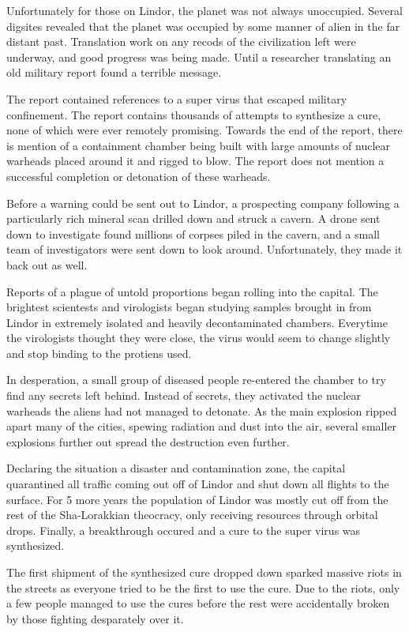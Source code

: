 Unfortunately for those on Lindor, the planet was not always unoccupied.
Several digsites revealed that the planet was occupied by some manner of alien
in the far distant past. Translation work on any recods of the civilization
left were underway, and good progress was being made. Until a researcher
translating an old military report found a terrible message.

The report contained references to a super virus that escaped military
confinement. The report contains thousands of attempts to synthesize a cure,
none of which were ever remotely promising. Towards the end of the report,
there is mention of a containment chamber being built with large amounts of
nuclear warheads placed around it and rigged to blow. The report does not
mention a successful completion or detonation of these warheads.

Before a warning could be sent out to Lindor, a prospecting company following
a particularly rich mineral scan drilled down and struck a cavern. A drone
sent down to investigate found millions of corpses piled in the cavern, and
a small team of investigators were sent down to look around. Unfortunately,
they made it back out as well.

Reports of a plague of untold proportions began rolling into the capital. The
brightest scientests and virologists began studying samples brought in from
Lindor in extremely isolated and heavily decontaminated chambers. Everytime
the virologists thought they were close, the virus would seem to change
slightly and stop binding to the protiens used.

In desperation, a small group of diseased people re-entered the chamber to try
find any secrets left behind. Instead of secrets, they activated the nuclear
warheads the aliens had not managed to detonate. As the main explosion ripped
apart many of the cities, spewing radiation and dust into the air, several
smaller explosions further out spread the destruction even further.

Declaring the situation a disaster and contamination zone, the capital
quarantined all traffic coming out off of Lindor and shut down all flights to the
surface. For 5 more years the population of Lindor was mostly cut off from the
rest of the Sha-Lorakkian theocracy, only receiving resources through
orbital drops. Finally, a breakthrough occured and a cure to the super virus
was synthesized.

The first shipment of the synthesized cure dropped down sparked massive riots in
the streets as everyone tried to be the first to use the cure. Due to the riots,
only a few people managed to use the cures before the rest were accidentally
broken by those fighting desparately over it.

